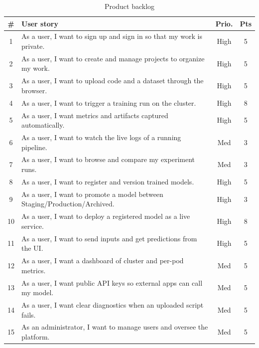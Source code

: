 \begin{table}[H]\centering
\caption{Product backlog}\label{tab:backlog}
\renewcommand{\arraystretch}{1.25}
\begin{tabularx}{\textwidth}{|c|X|c|c|}
\hline
\textbf{\#} & \textbf{User story} & \textbf{Prio.} & \textbf{Pts}\\
\hline
1  & As a user, I want to sign up and sign in so that my work is private.        & High & 5\\ \hline
2  & As a user, I want to create and manage projects to organize my work.        & High & 5\\ \hline
3  & As a user, I want to upload code and a dataset through the browser.         & High & 5\\ \hline
4  & As a user, I want to trigger a training run on the cluster.                 & High & 8\\ \hline
5  & As a user, I want metrics and artifacts captured automatically.             & High & 5\\ \hline
6  & As a user, I want to watch the live logs of a running pipeline.             & Med  & 3\\ \hline
7  & As a user, I want to browse and compare my experiment runs.                 & Med  & 3\\ \hline
8  & As a user, I want to register and version trained models.                   & High & 5\\ \hline
9  & As a user, I want to promote a model between Staging/Production/Archived.   & High & 3\\ \hline
10 & As a user, I want to deploy a registered model as a live service.           & High & 8\\ \hline
11 & As a user, I want to send inputs and get predictions from the UI.           & High & 5\\ \hline
12 & As a user, I want a dashboard of cluster and per-pod metrics.               & Med  & 5\\ \hline
13 & As a user, I want public API keys so external apps can call my model.       & Med  & 5\\ \hline
14 & As a user, I want clear diagnostics when an uploaded script fails.          & Med  & 5\\ \hline
15 & As an administrator, I want to manage users and oversee the platform.       & Med  & 5\\ \hline
\end{tabularx}
\end{table}

